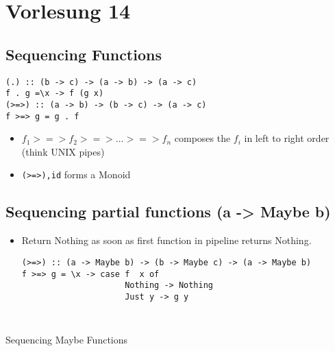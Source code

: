 \documentclass{article}
\newcommand{\Haskell}[1]{\texttt{#1}}
\begin{document}
\section{Vorlesung 14}
\subsection{Sequencing Functions}
\begin{verbatim}
(.) :: (b -> c) -> (a -> b) -> (a -> c)
f . g =\x -> f (g x)
(>=>) :: (a -> b) -> (b -> c) -> (a -> c)
f >=> g = g . f  
\end{verbatim}
\begin{itemize}
\item $f_1 {>=>} f_2 {>=>} \ldots {>=>} f_n$ composes the $f_i$ in left to right order (think UNIX pipes)
\item \Haskell{(>=>),id} forms a Monoid
\end{itemize}
\subsection{Sequencing partial functions (a -> Maybe b)}
\begin{itemize}
\item Return Nothing as soon as first function in pipeline returns Nothing.
\begin{verbatim}
(>=>) :: (a -> Maybe b) -> (b -> Maybe c) -> (a -> Maybe b)
f >=> g = \x -> case f  x of
                     Nothing -> Nothing
                     Just y -> g y
                     
\end{verbatim}
\end{itemize}
\begin{listing}
\inputminted{Haskell}{Sequence-Maybe.hs}
\caption{Sequencing Maybe Functions}
\end{listing}
\end{document}
